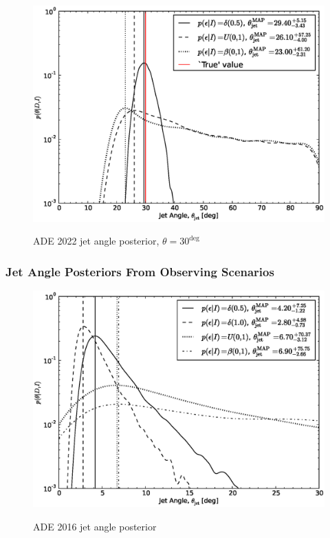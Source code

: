 \documentclass[twocolumn,nofootinbib]{revtex4-1}
\begin{document}
\begin{figure}
\centering
{\includegraphics[width=\linewidth]{jet_angle_posterior_aligo_2022.eps}}
\caption{ADE 2022 jet angle posterior, 
$\theta = 30^{\deg}$\label{fig:njjetposterio2022}}
\end{figure}


\subsubsection{Jet Angle Posteriors From Observing Scenarios}

\begin{figure}
\centering
{\includegraphics[width=\linewidth]{jet_angle_posterior_aligo_2016_real.eps}}
\caption{ADE 2016 jet angle posterior}
\end{figure}
\end{document}
